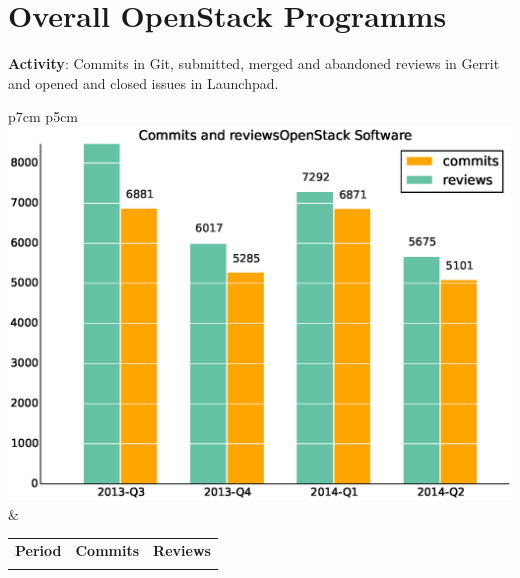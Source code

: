 \documentclass[a4wide,11pt]{report}
\begin{document}
\newpage
\section{Overall OpenStack Programms}

\textbf{Activity}: Commits in Git, submitted, merged and abandoned reviews in Gerrit and opened and closed issues in Launchpad.

\begin{tabular}{p{7cm} p{5cm}}
    \vspace{0pt} 
    \includegraphics[scale=.35]{figs/commitsOpenStackSoftware.eps}
    & 
    \vspace{0pt}
    \begin{tabular}{l|r|r|}%
    \bfseries Period & \bfseries Commits & \bfseries Reviews%
    \csvreader[head to column names]{data/commitsOpenStackSoftware.csv}{}%
    {\\ & \commits & \submitted}
    \end{tabular}
\end{tabular}
\end{document}
